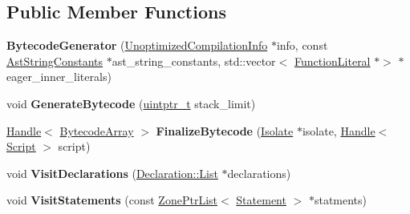 \subsection*{Public Member Functions}
\begin{DoxyCompactItemize}
\item 
\mbox{\label{classv8_1_1internal_1_1interpreter_1_1BytecodeGenerator_ac4631a891725f4cd325adb4cad97ccdc}} 
{\bfseries Bytecode\+Generator} (\mbox{\hyperlink{classv8_1_1internal_1_1UnoptimizedCompilationInfo}{Unoptimized\+Compilation\+Info}} $\ast$info, const \mbox{\hyperlink{classv8_1_1internal_1_1AstStringConstants}{Ast\+String\+Constants}} $\ast$ast\+\_\+string\+\_\+constants, std\+::vector$<$ \mbox{\hyperlink{classv8_1_1internal_1_1FunctionLiteral}{Function\+Literal}} $\ast$$>$ $\ast$eager\+\_\+inner\+\_\+literals)
\item 
\mbox{\label{classv8_1_1internal_1_1interpreter_1_1BytecodeGenerator_a16a6e87a78b3d35ec6eb5278babad5be}} 
void {\bfseries Generate\+Bytecode} (\mbox{\hyperlink{classuintptr__t}{uintptr\+\_\+t}} stack\+\_\+limit)
\item 
\mbox{\label{classv8_1_1internal_1_1interpreter_1_1BytecodeGenerator_a55291a15a37126f1a3b7f45eb52975fd}} 
\mbox{\hyperlink{classv8_1_1internal_1_1Handle}{Handle}}$<$ \mbox{\hyperlink{classv8_1_1internal_1_1BytecodeArray}{Bytecode\+Array}} $>$ {\bfseries Finalize\+Bytecode} (\mbox{\hyperlink{classv8_1_1internal_1_1Isolate}{Isolate}} $\ast$isolate, \mbox{\hyperlink{classv8_1_1internal_1_1Handle}{Handle}}$<$ \mbox{\hyperlink{classv8_1_1internal_1_1Script}{Script}} $>$ script)
\item 
\mbox{\label{classv8_1_1internal_1_1interpreter_1_1BytecodeGenerator_ade0d28db74cc7bef573590c8b1dbcb5f}} 
void {\bfseries Visit\+Declarations} (\mbox{\hyperlink{classv8_1_1base_1_1ThreadedListBase}{Declaration\+::\+List}} $\ast$declarations)
\item 
\mbox{\label{classv8_1_1internal_1_1interpreter_1_1BytecodeGenerator_a79a0fc0b6a939e65963e7b448d7a892e}} 
void {\bfseries Visit\+Statements} (const \mbox{\hyperlink{classv8_1_1internal_1_1ZoneList}{Zone\+Ptr\+List}}$<$ \mbox{\hyperlink{classv8_1_1internal_1_1Statement}{Statement}} $>$ $\ast$statments)
\end{DoxyCompactItemize}
